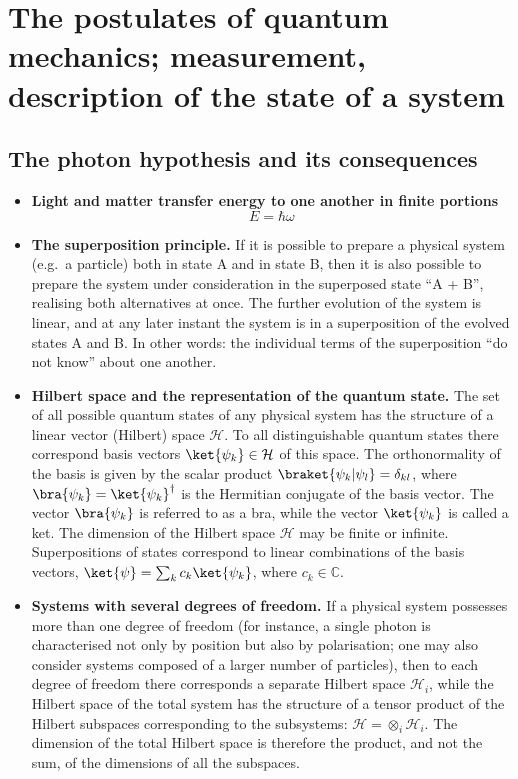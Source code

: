 \section{The postulates of quantum mechanics; measurement, description of the state of a system}

\subsection{The photon hypothesis and its consequences}

\begin{itemize}
    \item \textbf{Light and matter transfer energy to one another in finite portions}
    \begin{equation}
    E = \hbar\omega
    \end{equation}
    \item \textbf{The superposition principle.} If it is possible to prepare a physical system (e.g.\ a particle) both in state A and in state B, then it is also possible to prepare the system under consideration in the superposed state ``A + B'', realising both alternatives at once. The further evolution of the system is linear, and at any later instant the system is in a superposition of the evolved states A and B. In other words: the individual terms of the superposition ``do not know'' about one another.
    \item \textbf{Hilbert space and the representation of the quantum state.} The set of all possible quantum states of any physical system has the structure of a linear vector (Hilbert) space $\mathcal{H}$. To all distinguishable quantum states there correspond basis vectors $\ket{\psi_{k}} \in \mathcal{H}$ of this space. The orthonormality of the basis is given by the scalar product $\braket{\psi_{k}|\psi_{l}} = \delta_{kl}$, where $\bra{\psi_{k}} = \ket{\psi_{k}}^{\dag}$ is the Hermitian conjugate of the basis vector. The vector $\bra{\psi_{k}}$ is referred to as a bra, while the vector $\ket{\psi_{k}}$ is called a ket. The dimension of the Hilbert space $\mathcal{H}$ may be finite or infinite. Superpositions of states correspond to linear combinations of the basis vectors, $\ket{\psi} = \sum_{k}c_{k}\ket{\psi_{k}}$, where $c_{k} \in \mathbb{C}$.
    \item \textbf{Systems with several degrees of freedom.} If a physical system possesses more than one degree of freedom (for instance, a single photon is characterised not only by position but also by polarisation; one may also consider systems composed of a larger number of particles), then to each degree of freedom there corresponds a separate Hilbert space $\mathcal{H}_{i}$, while the Hilbert space of the total system has the structure of a tensor product of the Hilbert subspaces corresponding to the subsystems: $\mathcal{H} =\otimes_{i}\mathcal{H}_{i}$. The dimension of the total Hilbert space is therefore the product, and not the sum, of the dimensions of all the subspaces.

\end{itemize}
